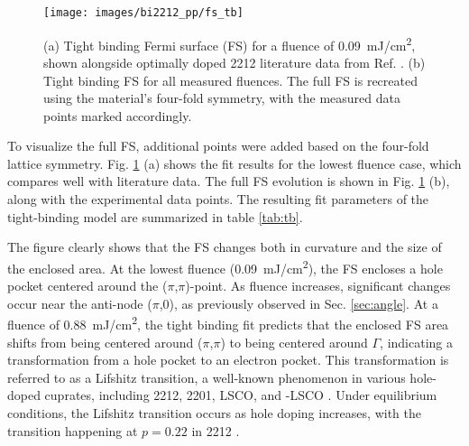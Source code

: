 \begin{figure}[t!]
	\centering
	\texttt{[image: images/bi2212\_pp/fs\_tb]}
	\caption{(a) Tight binding Fermi surface (FS) for a fluence of \qty{0.09}{\milli\joule/\centi\meter\squared}, shown alongside optimally doped 2212 literature data from Ref. \cite{kondo_hole-concentration_2004}. (b) Tight binding FS for all measured fluences. The full FS is recreated using the material's four-fold symmetry, with the measured data points marked accordingly.}
	\label{fig:fs_tb}
\end{figure}


To visualize the full FS, additional points were added based on the four-fold lattice symmetry.
Fig. \ref{fig:fs_tb} (a) shows the fit results for the lowest fluence case, which compares well with literature data.
The full FS evolution is shown in Fig. \ref{fig:fs_tb} (b), along with the experimental data points.
The resulting fit parameters of the tight-binding model are summarized in table \ref{tab:tb}.

The figure clearly shows that the FS changes both in curvature and the size of the enclosed area.
At the lowest fluence (\qty{0.09}{\milli\joule/\centi\meter\squared}), the FS encloses a hole pocket centered around the ($\pi$,$\pi$)-point.
As fluence increases, significant changes occur near the anti-node ($\pi$,$0$), as previously observed in Sec. \ref{sec:angle}.
At a fluence of \qty{0.88}{\milli\joule/\centi\meter\squared}, the tight binding fit predicts that the enclosed FS area shifts from being centered around ($\pi$,$\pi$) to being centered around $\Gamma$, indicating a transformation from a hole pocket to an electron pocket.
This transformation is referred to as a Lifshitz transition, a well-known phenomenon in various hole-doped cuprates, including 2212, 2201, LSCO, and -LSCO \cite{kaminski_change_2006,matt_electron_2015,ding_disappearance_2019,kondo_hole-concentration_2004}.
Under equilibrium conditions, the Lifshitz transition occurs as hole doping increases, with the transition happening at $p=0.22$ in 2212 \cite{kaminski_change_2006}.

